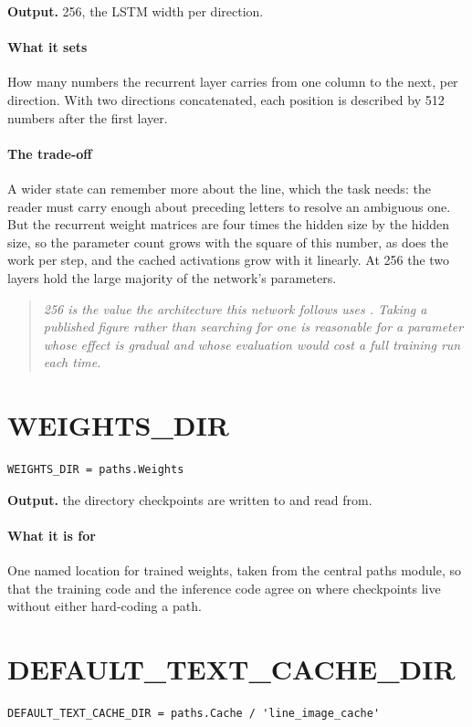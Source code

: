\noindent\textbf{Output.} 256, the LSTM width per direction.


\paragraph{What it sets}
How many numbers the recurrent layer carries from one column to the next, per direction. With two directions concatenated, each position is described by 512 numbers after the first layer.


\paragraph{The trade-off}
A wider state can remember more about the line, which the task needs: the reader must carry enough about preceding letters to resolve an ambiguous one. But the recurrent weight matrices are four times the hidden size by the hidden size, so the parameter count grows with the square of this number, as does the work per step, and the cached activations grow with it linearly. At 256 the two layers hold the large majority of the network's parameters.


\begin{quote}\small\itshape 256 is the value the architecture this network follows uses \cite{shi2017}. Taking a published figure rather than searching for one is reasonable for a parameter whose effect is gradual and whose evaluation would cost a full training run each time.\end{quote}

\section{WEIGHTS\_DIR}
\begin{lstlisting}[style=sig]
WEIGHTS_DIR = paths.Weights
\end{lstlisting}

\noindent\textbf{Output.} the directory checkpoints are written to and read from.


\paragraph{What it is for}
One named location for trained weights, taken from the central paths module, so that the training code and the inference code agree on where checkpoints live without either hard-coding a path.


\section{DEFAULT\_TEXT\_CACHE\_DIR}
\begin{lstlisting}[style=sig]
DEFAULT_TEXT_CACHE_DIR = paths.Cache / 'line_image_cache'
\end{lstlisting}

